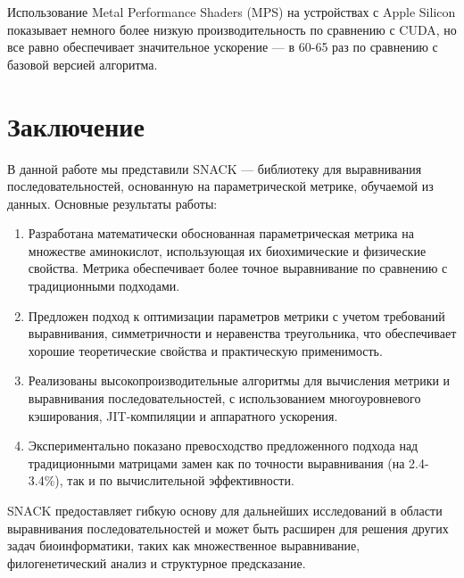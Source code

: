 \documentclass[12pt]{article}
\begin{document}
Использование Metal Performance Shaders (MPS) на устройствах с Apple Silicon показывает немного более низкую производительность по сравнению с CUDA, но все равно обеспечивает значительное ускорение — в 60-65 раз по сравнению с базовой версией алгоритма.

\section{Заключение}

В данной работе мы представили SNACK — библиотеку для выравнивания последовательностей, основанную на параметрической метрике, обучаемой из данных. Основные результаты работы:

\begin{enumerate}
    \item Разработана математически обоснованная параметрическая метрика на множестве аминокислот, использующая их биохимические и физические свойства. Метрика обеспечивает более точное выравнивание по сравнению с традиционными подходами.
    \item Предложен подход к оптимизации параметров метрики с учетом требований выравнивания, симметричности и неравенства треугольника, что обеспечивает хорошие теоретические свойства и практическую применимость.
    \item Реализованы высокопроизводительные алгоритмы для вычисления метрики и выравнивания последовательностей, с использованием многоуровневого кэширования, JIT-компиляции и аппаратного ускорения.
    \item Экспериментально показано превосходство предложенного подхода над традиционными матрицами замен как по точности выравнивания (на 2.4-3.4\%), так и по вычислительной эффективности.
\end{enumerate}

SNACK предоставляет гибкую основу для дальнейших исследований в области выравнивания последовательностей и может быть расширен для решения других задач биоинформатики, таких как множественное выравнивание, филогенетический анализ и структурное предсказание.
\end{document}
